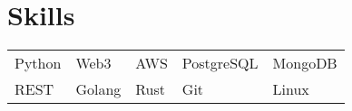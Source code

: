 \documentclass[a4paper,12pt]{article}
\begin{document}
\section{Skills}
\begin{tabularx}{\linewidth}{@{}l X@{} X@{} X@{} @{}l}
Python & Web3 & AWS & PostgreSQL & MongoDB \\
REST & Golang & Rust & Git & Linux \\
\end{tabularx}

\vfill
{}
\end{document}
